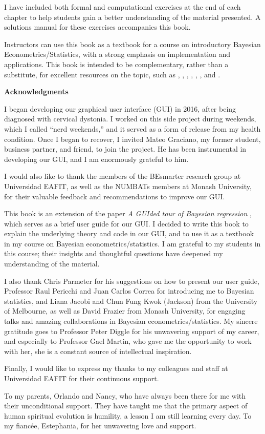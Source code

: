 I have included both formal and computational exercises at the end of each chapter to help students gain a better understanding of the material presented. A solutions manual for these exercises accompanies this book.

Instructors can use this book as a textbook for a course on introductory Bayesian Econometrics/Statistics, with a strong emphasis on implementation and applications. This book is intended to be complementary, rather than a substitute, for excellent resources on the topic, such as \cite{gelman2021bayesian}, \cite{chan2019bayesian}, \cite{rossi2012bayesian}, \cite{greenberg2012introduction}, \cite{geweke2005contemporary}, \cite{lancaster2004introduction}, and \cite{koop2003bayesian}.


\textbf{Acknowledgments}

I began developing our graphical user interface (GUI) in 2016, after being diagnosed with cervical dystonia. I worked on this side project during weekends, which I called ``nerd weekends,'' and it served as a form of release from my health condition. Once I began to recover, I invited Mateo Graciano, my former student, business partner, and friend, to join the project. He has been instrumental in developing our GUI, and I am enormously grateful to him. 

I would also like to thank the members of the BEsmarter research group at Universidad EAFIT, as well as the NUMBATs members at Monash University, for their valuable feedback and recommendations to improve our GUI.

This book is an extension of the paper \textit{A GUIded tour of Bayesian regression} \cite{Ramirez2020}, which serves as a brief user guide for our GUI. I decided to write this book to explain the underlying theory and code in our GUI, and to use it as a textbook in my course on Bayesian econometrics/statistics. I am grateful to my students in this course; their insights and thoughtful questions have deepened my understanding of the material.

I also thank Chris Parmeter for his suggestions on how to present our user guide, Professor Raul Pericchi and Juan Carlos Correa for introducing me to Bayesian statistics, and Liana Jacobi and Chun Fung Kwok (Jackson) from the University of Melbourne, as well as David Frazier from Monash University, for engaging talks and amazing collaborations in Bayesian econometrics/statistics. My sincere gratitude goes to Professor Peter Diggle for his unwavering support of my career, and especially to Professor Gael Martin, who gave me the opportunity to work with her, she is a constant source of intellectual inspiration.

Finally, I would like to express my thanks to my colleagues and staff at Universidad EAFIT for their continuous support.

To my parents, Orlando and Nancy, who have always been there for me with their unconditional support. They have taught me that the primary aspect of human spiritual evolution is humility, a lesson I am still learning every day. To my fiancée, Estephania, for her unwavering love and support.




